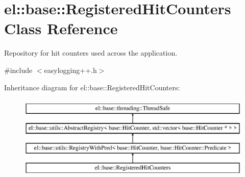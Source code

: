 \hypertarget{classel_1_1base_1_1_registered_hit_counters}{}\section{el\+:\+:base\+:\+:Registered\+Hit\+Counters Class Reference}
\label{classel_1_1base_1_1_registered_hit_counters}


Repository for hit counters used across the application.  




{\ttfamily \#include $<$easylogging++.\+h$>$}

Inheritance diagram for el\+:\+:base\+:\+:Registered\+Hit\+Counters\+:\begin{figure}[H]
\begin{center}
\leavevmode
\includegraphics[height=4.000000cm]{classel_1_1base_1_1_registered_hit_counters}
\end{center}
\end{figure}
